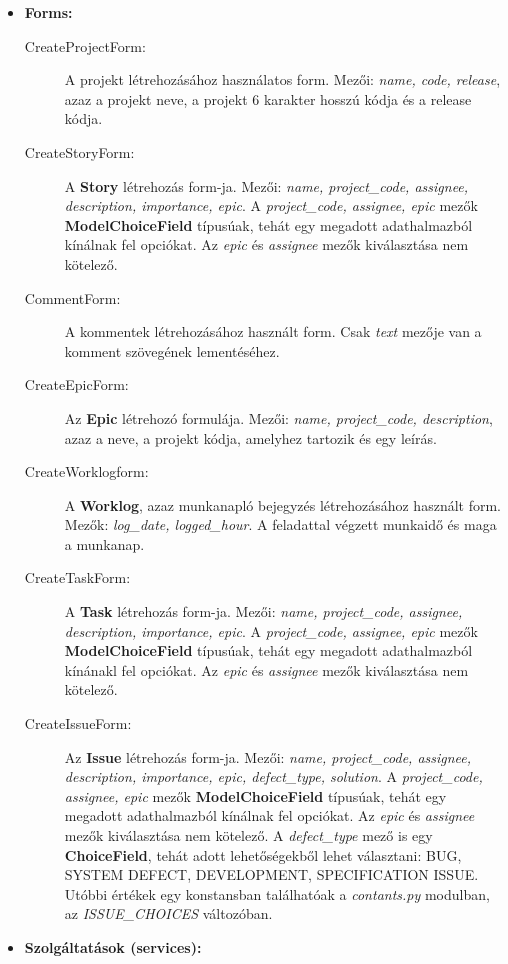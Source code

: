 \begin{itemize}
	\item \textbf{Forms:}
	\begin{description}
		\item[CreateProjectForm:] A projekt létrehozásához használatos form. Mezői: \textit{name, code, release}, azaz a projekt neve, a projekt 6 karakter hosszú kódja és a release kódja.
		\item[CreateStoryForm:] A \textbf{Story} létrehozás form-ja. Mezői: \textit{name, project\_code, assignee, description, importance, epic}. A \textit{project\_code, assignee, epic} mezők \textbf{ModelChoiceField} típusúak, tehát egy megadott adathalmazból kínálnak fel opciókat. Az \textit{epic} és \textit{assignee} mezők kiválasztása nem kötelező.
		\item[CommentForm:] A kommentek létrehozásához használt form. Csak \textit{text} mezője van a komment szövegének lementéséhez.
		\item[CreateEpicForm:] Az \textbf{Epic} létrehozó formulája. Mezői: \textit{name, project\_code, description}, azaz a neve, a projekt kódja, amelyhez tartozik és egy leírás.
		\item[CreateWorklogform:] A \textbf{Worklog}, azaz munkanapló bejegyzés létrehozásához használt form. Mezők: \textit{log\_date, logged\_hour}. A feladattal végzett munkaidő és maga a munkanap.
		\item[CreateTaskForm:]  A \textbf{Task} létrehozás form-ja. Mezői: \textit{name, project\_code, assignee, description, importance, epic}. A \textit{project\_code, assignee, epic} mezők \textbf{ModelChoiceField} típusúak, tehát egy megadott adathalmazból kínánakl fel opciókat. Az \textit{epic} és \textit{assignee} mezők kiválasztása nem kötelező.
		\item[CreateIssueForm:] Az \textbf{Issue} létrehozás form-ja. Mezői: \textit{name, project\_code, assignee, description, importance, epic, defect\_type, solution}. A \textit{project\_code, assignee, epic} mezők \textbf{ModelChoiceField} típusúak, tehát egy megadott adathalmazból kínálnak fel opciókat. Az \textit{epic} és \textit{assignee} mezők kiválasztása nem kötelező. A \textit{defect\_type} mező is egy \textbf{ChoiceField}, tehát adott lehetőségekből lehet választani: BUG, SYSTEM DEFECT, DEVELOPMENT, SPECIFICATION ISSUE. Utóbbi értékek egy konstansban találhatóak a \textit{contants.py} modulban, az \textit{ISSUE\_CHOICES} változóban.
	\end{description}
	\item \textbf{Szolgáltatások (services):}

\end{itemize}
